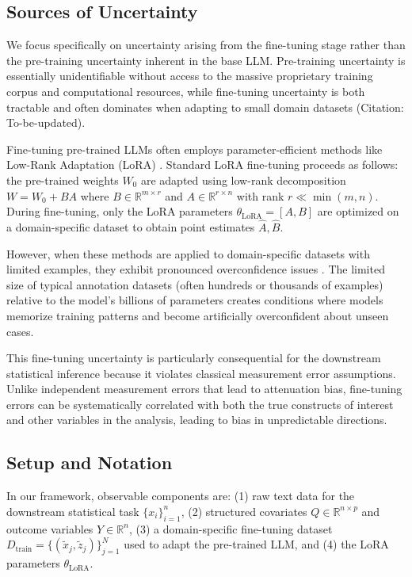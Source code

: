 \documentclass[11pt]{article}
\begin{document}
\subsection{Sources of Uncertainty}

We focus specifically on uncertainty arising from the fine-tuning stage rather than 
the pre-training uncertainty inherent in the base LLM. 
Pre-training uncertainty is essentially unidentifiable without access 
to the massive proprietary training corpus and computational resources, 
while fine-tuning uncertainty is both tractable and often dominates 
when adapting to small domain datasets (Citation: To-be-updated).

Fine-tuning pre-trained LLMs often employs parameter-efficient methods like Low-Rank Adaptation (LoRA) \citep{hu2022lora}. 
Standard LoRA fine-tuning proceeds as follows: 
the pre-trained weights $W_0$ are adapted using low-rank decomposition $W = W_0 + BA$ where $B \in \mathbb{R}^{m \times r}$ and $A \in \mathbb{R}^{r \times n}$ with rank $r \ll \min(m, n)$. 
During fine-tuning, only the LoRA parameters $\theta_{\text{LoRA}} = [A, B]$ 
are optimized on a domain-specific dataset to obtain point estimates $\hat{A}, \hat{B}$.

However, when these methods are applied to domain-specific datasets with limited examples, 
they exhibit pronounced overconfidence issues \citep{yang2023bayesian, wang2024blob}. 
The limited size of typical annotation datasets (often hundreds or thousands of examples) 
relative to the model's billions of parameters creates conditions where models memorize training patterns 
and become artificially overconfident about unseen cases.

This fine-tuning uncertainty is particularly consequential for the downstream statistical inference 
because it violates classical measurement error assumptions. 
Unlike independent measurement errors that lead to attenuation bias, 
fine-tuning errors can be systematically correlated with both the true constructs of interest 
and other variables in the analysis, leading to bias in unpredictable directions.

\subsection{Setup and Notation}

In our framework, observable components are:
(1) raw text data for the downstream statistical task $\{x_i\}_{i=1}^n$, 
(2) structured covariates $Q \in \mathbb{R}^{n \times p}$ and outcome variables $Y \in \mathbb{R}^n$,
(3) a domain-specific fine-tuning dataset $D_{\text{train}} = \{(\tilde{x}_j, \tilde{z}_j)\}_{j=1}^N$ used to adapt the pre-trained LLM, and 
(4) the LoRA parameters $\theta_{\text{LoRA}}$.
\end{document}
